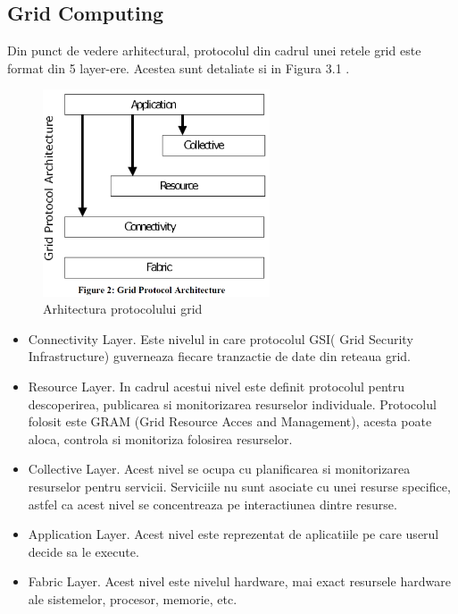 
\subsection{Grid Computing}

Din punct de vedere arhitectural, protocolul din cadrul unei retele grid este format din 5
layer-ere. Acestea sunt detaliate si in Figura 3.1 \cite{foster2008cloud}.

\begin{figure}[ht] \centering
\includegraphics[width=0.6\textwidth]{img/grid.png}
\caption{Arhitectura protocolului grid} \end{figure}


\begin{itemize}

    \item Connectivity Layer. Este nivelul in care protocolul GSI( Grid Security Infrastructure)
        guverneaza fiecare tranzactie de date din reteaua grid. 
\item Resource Layer. In cadrul acestui nivel este definit protocolul pentru descoperirea,
    publicarea si monitorizarea resurselor individuale. Protocolul folosit este GRAM (Grid Resource
    Acces and Management), acesta poate aloca, controla si monitoriza folosirea resurselor. 
\item Collective Layer. Acest nivel se ocupa cu planificarea si monitorizarea resurselor pentru
    servicii. Serviciile nu sunt asociate cu unei resurse specifice, astfel ca acest nivel se
    concentreaza pe interactiunea dintre resurse.
\item Application Layer. Acest nivel este reprezentat de aplicatiile pe care userul decide sa le
    execute.
\item Fabric Layer. Acest nivel este nivelul hardware, mai exact resursele hardware ale
    sistemelor, procesor, memorie, etc.
\end{itemize}


